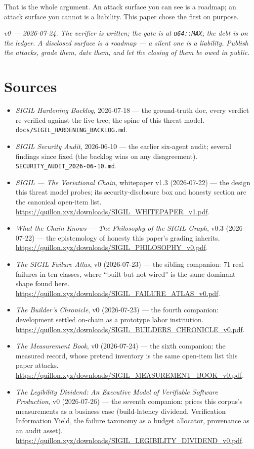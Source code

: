 \documentclass[10pt,a4paper]{article}
\begin{document}
That is the whole argument. An attack surface you can see is a roadmap; an attack surface
you cannot is a liability. This paper chose the first on purpose.

\vspace{8pt}
\noindent\textit{v0 — 2026-07-24. The verifier is written; the gate is at \texttt{u64::MAX};
the debt is on the ledger. A disclosed surface is a roadmap — a silent one is a liability.
Publish the attacks, grade them, date them, and let the closing of them be owed in public.}

\section*{Sources}
\label{sec:sources}
\small
\begin{itemize}[leftmargin=1.2em,itemsep=1pt]
\item \emph{SIGIL Hardening Backlog}, 2026-07-18 — the ground-truth doc, every verdict
re-verified against the live tree; the spine of this threat model.
\texttt{docs/SIGIL\_HARDENING\_BACKLOG.md}.
\item \emph{SIGIL Security Audit}, 2026-06-10 — the earlier six-agent audit; several
findings since fixed (the backlog wins on any disagreement).
\texttt{SECURITY\_AUDIT\_2026-06-10.md}.
\item \emph{SIGIL — The Variational Chain}, whitepaper v1.3 (2026-07-22) — the design this
threat model probes; its security-disclosure box and honesty section are the canonical
open-item list. \url{https://quillon.xyz/downloads/SIGIL_WHITEPAPER_v1.pdf}.
\item \emph{What the Chain Knows — The Philosophy of the SIGIL Graph}, v0.3 (2026-07-22) —
the epistemology of honesty this paper's grading inherits.
\url{https://quillon.xyz/downloads/SIGIL_PHILOSOPHY_v0.pdf}.
\item \emph{The SIGIL Failure Atlas}, v0 (2026-07-23) — the sibling companion: 71 real
failures in ten classes, where ``built but not wired'' is the same dominant shape found
here. \url{https://quillon.xyz/downloads/SIGIL_FAILURE_ATLAS_v0.pdf}.
\item \emph{The Builder's Chronicle}, v0 (2026-07-23) — the fourth companion: development
settled on-chain as a prototype labor institution.
\url{https://quillon.xyz/downloads/SIGIL_BUILDERS_CHRONICLE_v0.pdf}.
\item \emph{The Measurement Book}, v0 (2026-07-24) — the sixth companion: the measured
record, whose pretend inventory is the same open-item list this paper attacks.
\url{https://quillon.xyz/downloads/SIGIL_MEASUREMENT_BOOK_v0.pdf}.
\item \emph{The Legibility Dividend: An Executive Model of Verifiable Software Production}, v0 (2026-07-26) --- the seventh companion: prices this corpus's measurements as a business case (build-latency dividend, Verification Information Yield, the failure taxonomy as a budget allocator, provenance as an audit asset). \url{https://quillon.xyz/downloads/SIGIL_LEGIBILITY_DIVIDEND_v0.pdf}.
\end{itemize}
\end{document}
